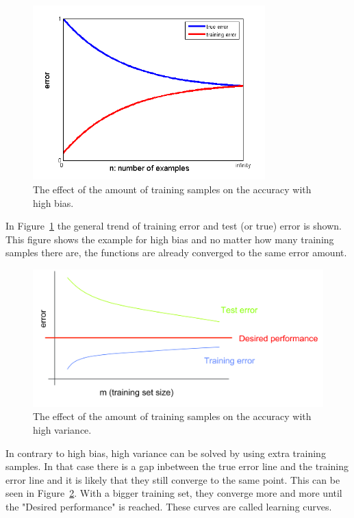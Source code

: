 \begin{figure}[H]
\centering
\includegraphics[width=0.8\textwidth]{Figures/bias_variance_chart}
\decoRule
\caption[Training samples comparison with high bias]{The effect of the amount of training samples on the accuracy with high bias. \cite{highbias}}
\label{fig:trainingsamples}
\end{figure}
\noindent In Figure~\ref{fig:trainingsamples} the general trend of training error and test (or true) error is shown. This figure shows the example for high bias and no matter how many training samples there are, the functions are already converged to the same error amount.
\begin{figure}[H]
\centering
\includegraphics[width=\textwidth]{Figures/highvariance}
\decoRule
\caption[Training samples comparison with high variance]{The effect of the amount of training samples on the accuracy with high variance. \cite{highvariance}}
\label{fig:trainingsamples2}
\end{figure}
\noindent In contrary to high bias, high variance can be solved by using extra training samples. In that case there is a gap inbetween the true error line and the training error line and it is likely that they still converge to the same point. This can be seen in Figure~\ref{fig:trainingsamples2}. With a bigger training set, they converge more and more until the "Desired performance" is reached. These curves are called learning curves.

